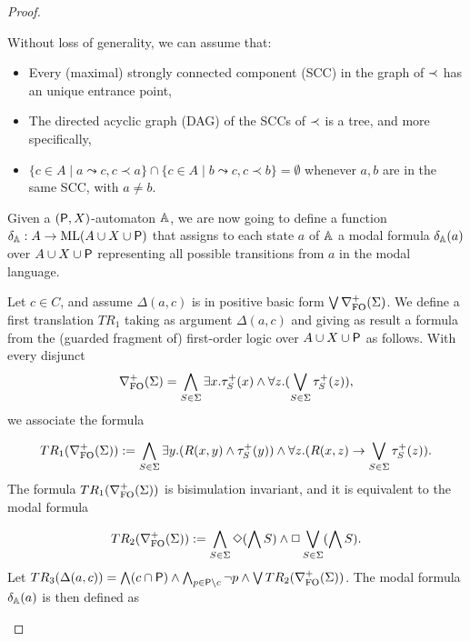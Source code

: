 \begin{proof}
\begin{pfclaim}
Without loss of generality, we can assume that:
\begin{itemize}
 pt
\item Every (maximal) strongly connected component (SCC) in the graph of $\prec$ has an unique entrance point,
\item The directed acyclic graph (DAG) of the SCCs of $\prec$ is a tree, and more specifically,
\item %
$\{c \in A \mid a \leadsto c, c \prec a\}  \cap \{c \in A \mid b \leadsto c, c \prec b\}  = \emptyset$ whenever $a,b$ are in the same SCC, with $a\neq b$.
\end{itemize}

Given a $(\mathsf{P},X)$-automaton $\mathbb{A}$, we are now going to define a function $\delta_\mathbb{A}: A \to \mathrm{ML} (A \cup X \cup \mathsf{P})$
that assigns to each state $a$ of $\mathbb{A}$ a modal formula $\delta_\mathbb{A}(a)$ over  $A \cup X \cup \mathsf{P}$ representing all possible transitions from $a$ in the modal language.  %

Let $c \in C$, and assume $\Delta(a,c)$ is in positive basic form $\bigvee \nabla^+_{\mathrm{FO}}(\Sigma)$. We define a first translation $TR_1$ taking as argument $\Delta(a,c)$ and giving as result a formula from the (guarded fragment of) first-order logic over $A \cup X \cup \mathsf{P}$ as follows. %
With every disjunct
$$
\nabla^+_{\mathrm{FO}}(\Sigma) = \bigwedge_{S\in\Sigma} \exists x. \tau^+_{S}(x) \land \forall z.( \bigvee_{S\in \Sigma} \tau^+_S(z)),
$$
%
we associate the formula

$$
TR_1(\nabla^+_{\mathrm{FO}}(\Sigma)) := \bigwedge_{S\in\Sigma} \exists y. (R(x,y) \land \tau^+_{S}(y)) \land \forall z.( R(x,z) \to \bigvee_{S\in \Sigma} \tau^+_S(z)).
$$
The formula $TR_1(\nabla^+_{\mathrm{FO}}(\Sigma))$ is bisimulation invariant, and it is equivalent to the modal formula

$$
TR_2(\nabla^+_{\mathrm{FO}}(\Sigma)) := \bigwedge_{S\in\Sigma}  \Diamond(\bigwedge S) \land \Box \bigvee_{S\in \Sigma} (\bigwedge S).
$$
Let $TR_3(\Delta(a,c))= \bigwedge (c \cap \mathsf{P}) \land \bigwedge_{p \in \mathsf{P} \setminus c} \lnot p \land \bigvee TR_2(\nabla^+_{\mathrm{FO}}(\Sigma))$.
 The modal formula $\delta_\mathbb{A}(a)$ is then defined as


\end{pfclaim}
\end{proof}
